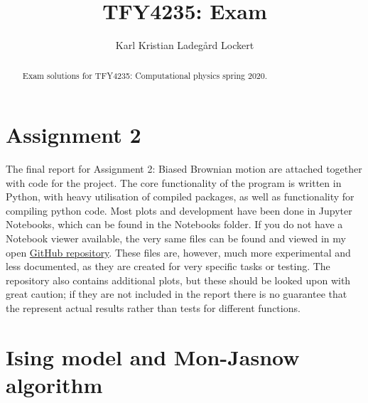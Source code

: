 \documentclass[11pt,a4paper,twocolumn]{article}
\author{Karl Kristian Ladegård Lockert}
\title{TFY4235: Exam}
\begin{document}
\maketitle
\begin{abstract}
	
	Exam solutions for TFY4235: Computational physics spring 2020.
	
\end{abstract}
		
\section{Assignment 2}
The final report for Assignment 2: Biased Brownian motion are attached together with code for the project. The core functionality of the program is written in Python, with heavy utilisation of compiled packages, as well as functionality for compiling python code. Most plots and development have been done in Jupyter Notebooks, which can be found in the Notebooks folder. If you do not have a Notebook viewer available, the very same files can be found and viewed in my open \href{https://github.com/kklocker/NumFys}{GitHub repository}. These files are, however, much more experimental and less documented, as they are created for very specific tasks or testing. The repository also contains additional plots, but these should be looked upon with great caution; if they are not included in the report there is no guarantee that the represent actual results rather than tests for different functions. 

\section{Ising model and Mon-Jasnow algorithm}
\end{document}
